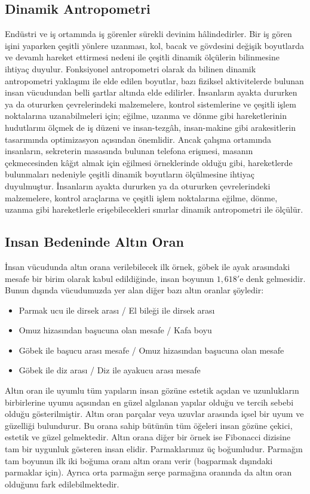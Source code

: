 \documentclass[11pt,a4paper]{report}
\begin{document}
	\subsection{Dinamik Antropometri}
	Endüstri ve iş ortamında iş görenler sürekli devinim hâlindedirler. Bir iş gören işini yaparken çeşitli yönlere uzanması, kol, bacak ve gövdesini değişik boyutlarda ve devamlı hareket ettirmesi nedeni ile çeşitli dinamik ölçülerin bilinmesine ihtiyaç duyulur. Fonksiyonel antropometri olarak da bilinen dinamik antropometri yaklaşımı ile elde edilen boyutlar, bazı fiziksel aktivitelerde bulunan insan vücudundan belli şartlar altında elde edilirler. İnsanların ayakta dururken ya da otururken çevrelerindeki malzemelere, kontrol sistemlerine ve çeşitli işlem noktalarına uzanabilmeleri için; eğilme, uzanma ve dönme gibi hareketlerinin hudutlarını ölçmek de iş düzeni ve insan-tezgâh, insan-makine gibi arakesitlerin tasarımında optimizasyon açısından önemlidir. Ancak çalışma ortamında insanların, sekreterin masasında bulunan telefona erişmesi, masanın çekmecesinden kâğıt almak için eğilmesi örneklerinde olduğu gibi, hareketlerde bulunmaları nedeniyle çeşitli dinamik boyutların ölçülmesine ihtiyaç duyulmuştur. İnsanların ayakta dururken ya da otururken çevrelerindeki malzemelere, kontrol araçlarına ve çeşitli işlem noktalarına eğilme, dönme, uzanma gibi hareketlerle erişebilecekleri sınırlar dinamik antropometri ile ölçülür.
	
	
	\subsection{Insan Bedeninde Altın Oran}
	
	İnsan vücudunda altın orana verilebilecek ilk örnek, göbek ile ayak arasındaki mesafe bir birim olarak kabul edildiğinde, insan boyunun $1,618'$e denk gelmesidir. Bunun dışında vücudumuzda yer alan diğer bazı altın oranlar şöyledir:
	
	\begin{itemize}
		\item Parmak ucu ile dirsek arası / El bileği ile dirsek arası
		\item Omuz hizasından başucuna olan mesafe / Kafa boyu
		\item Göbek ile başucu arası mesafe / Omuz hizasından başucuna olan mesafe
		\item Göbek ile diz arası / Diz ile ayakucu arası mesafe
	\end{itemize}
	
	Altın oran ile uyumlu tüm yapıların insan gözüne estetik açıdan ve uzunlukların birbirlerine uyumu açısından en güzel algılanan yapılar olduğu ve tercih sebebi olduğu gösterilmiştir. Altın oran parçalar veya uzuvlar arasında içsel bir uyum ve güzelliği bulundurur. Bu orana sahip bütünün tüm öğeleri insan gözüne çekici, estetik ve güzel gelmektedir. Altın orana diğer bir örnek ise Fibonacci dizisine tam bir uygunluk gösteren insan elidir. Parmaklarımız üç boğumludur. Parmağın tam boyunun ilk iki boğuma oranı altın oranı verir (başparmak dışındaki parmaklar için). Ayrıca orta parmağın serçe parmağına oranında da altın oran olduğunu fark edilebilmektedir.
	
\end{document}
